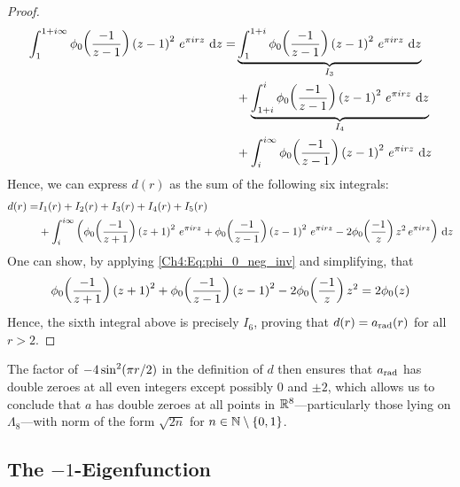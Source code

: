 \begin{proof}
\begin{align*}
        \int_{1}^{1 + i \infty} \phi_0\of{\frac{-1}{z - 1}} \parenth{z - 1}^2 \, e^{\pi i r z} \, \diff{z}
        =& \underbrace{\int_{1}^{1 + i} \phi_0\of{\frac{-1}{z - 1}} \parenth{z - 1}^2 \, e^{\pi i r z} \, \diff{z}}_{I_3} \\
        &+ \underbrace{\int_{1 + i}^{i} \phi_0\of{\frac{-1}{z - 1}} \parenth{z - 1}^2 \, e^{\pi i r z} \, \diff{z}}_{I_4} \\
        &+ \int_{i}^{i \infty} \phi_0\of{\frac{-1}{z - 1}} \parenth{z - 1}^2 \, e^{\pi i r z} \, \diff{z} %
    \end{align*}
    Hence, we can express $d(r)$ as the sum of the following six integrals:
    \begin{align*}
        d(r) =& I_1(r) + I_2(r) + I_3(r) + I_4(r) + I_5(r) \\
        &+ \int_{i}^{i\infty} \left( 
            \phi_0\!\left( \frac{-1}{z + 1} \right) \left( z + 1 \right)^2 \, e^{\pi i r z} +
            \phi_0\!\left( \frac{-1}{z - 1} \right) \left( z - 1 \right)^2 \, e^{\pi i r z} - 2
            \phi_0\!\left( \frac{-1}{z} \right) z^2 \, e^{\pi i r z}
         \right) \, \operatorname{d}\!{z}
    \end{align*}
    One can show, by applying \eqref{Ch4:Eq:phi_0_neg_inv} and simplifying, that
    \begin{align*}
        \phi_0\!\left( \frac{-1}{z + 1} \right) \left( z + 1 \right)^2 +
        \phi_0\!\left( \frac{-1}{z - 1} \right) \left( z - 1 \right)^2 -
        2\phi_0\!\left( \frac{-1}{z} \right) z^2 = 2\phi_0\!\left( z \right)
    \end{align*}
    Hence, the sixth integral above is precisely $I_6$, proving that $d(r) = a_{\operatorname{rad}}(r)$ for all $r > 2$.
\end{proof}

The factor of $-4\sin^2\!\left( \pi r / 2 \right)$ in the definition of $d$ then ensures that $a_{\operatorname{rad}}$ has double zeroes at all even integers except possibly $0$ and $\pm 2$, which allows us to conclude that $a$ has double zeroes at all points in $\mathbb{R}^8$---particularly those lying on $\Lambda_8$---with norm of the form $\sqrt{2n}$ for $n \in \mathbb{N} \setminus \left\{ 0, 1 \right\}$.

\subsection{The $-1$-Eigenfunction}


